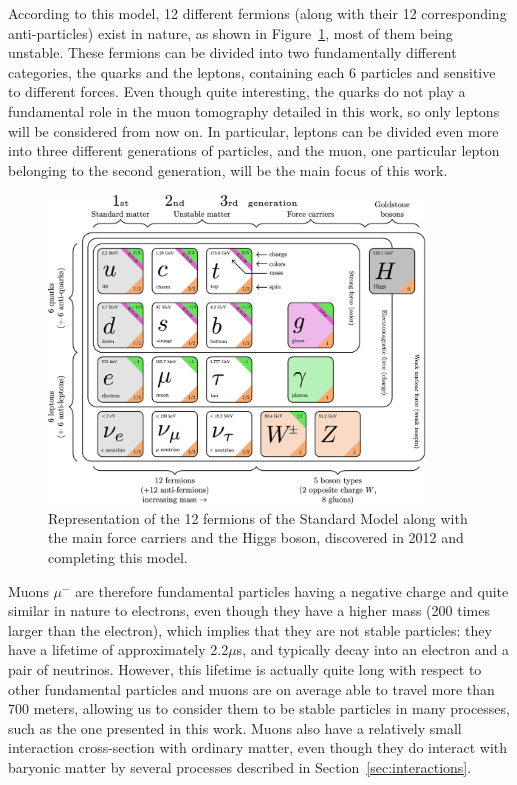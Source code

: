 \documentclass[a4paper, 11pt]{report}
\begin{document}
According to this model, 12 different fermions (along with their 12 corresponding anti-particles) exist in nature, as shown in Figure~\ref{figure:SMFermions}, most of them being unstable. These fermions can be divided into two fundamentally different categories, the quarks and the leptons, containing each 6 particles and sensitive to different forces. Even though quite interesting, the quarks do not play a fundamental role in the muon tomography detailed in this work, so only leptons will be considered from now on. In particular, leptons can be divided even more into three different generations of particles, and the muon, one particular lepton belonging to the second generation, will be the main focus of this work.

\begin{figure}[htbp]
\begin{center}
\includegraphics[width=10cm, height=8.2cm]{figs/SMFermions.png}
\caption{Representation of the 12 fermions of the Standard Model \cite{SMFermions} along with the main force carriers and the Higgs boson, discovered in 2012 and completing this model.}
\label{figure:SMFermions}
\end{center}
\end{figure}

Muons $\mu^{-}$ \cite{PDGMuons} are therefore fundamental particles having a negative charge and quite similar in nature to electrons, even though they have a higher mass (200 times larger than the electron), which implies that they are not stable particles: they have a lifetime of approximately 2.2$\mu$s, and typically decay into an electron and a pair of neutrinos. However, this lifetime is actually quite long with respect to other fundamental particles and muons are on average able to travel more than 700 meters, allowing us to consider them to be stable particles in many processes, such as the one presented in this work. Muons also have a relatively small interaction cross-section with ordinary matter, even though they do interact with baryonic matter by several processes described in Section~\ref{sec:interactions}.
\end{document}
